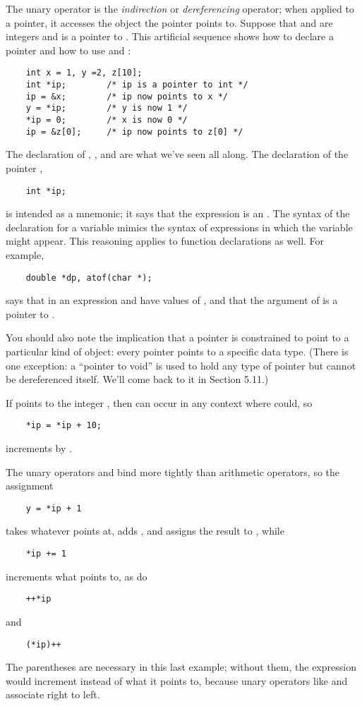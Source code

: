 The unary operator \code{*} is the \emph{indirection} or \emph{dereferencing} operator; when applied to a pointer, it accesses the object the pointer points to.
Suppose that  and  are integers and  is a pointer to .
This artificial sequence shows how to declare a pointer and how to use  and \code{*}:
\begin{lstlisting}
	int x = 1, y =2, z[10];
	int *ip; 		/* ip is a pointer to int */
	ip = &x;		/* ip now points to x */
	y = *ip;		/* y is now 1 */
	*ip = 0;		/* x is now 0 */
	ip = &z[0]; 	/* ip now points to z[0] */
\end{lstlisting}
The declaration of , , and  are what we've seen all along.
The declaration of the pointer ,
\begin{lstlisting}
	int *ip;
\end{lstlisting}
is intended as a mnemonic; it says that the expression  is an .
The syntax of the declaration for a variable mimics the syntax of expressions in which the variable might appear. This reasoning applies to function declarations as well.
For example,
\begin{lstlisting}
	double *dp, atof(char *);
\end{lstlisting}
says that in an expression  and  have values of , and that the argument of  is a pointer to .


You should also note the implication that a pointer is constrained to point to a particular kind of object: every pointer points to a specific data type.
(There is one exception: a ``pointer to void'' is used to hold any type of pointer but cannot be dereferenced itself. We'll come back to it in Section 5.11.)

If  points to the integer , then  can occur in any context where  could, so
\begin{lstlisting}
	*ip = *ip + 10;
\end{lstlisting}
increments  by .

The unary operators \code{*} and \code{\&} bind more tightly than arithmetic operators, so the assignment
\begin{lstlisting}
	y = *ip + 1
\end{lstlisting}
takes whatever  points at, adds , and assigns the result to , while
\begin{lstlisting}
	*ip += 1
\end{lstlisting}
increments what  points to, as do
\begin{lstlisting}
	++*ip
\end{lstlisting}
and
\begin{lstlisting}
	(*ip)++
\end{lstlisting}
The parentheses are necessary in this last example; without them, the expression would increment  instead of what it points to, because unary operators like \code{*} and \code{++} associate right to left.

